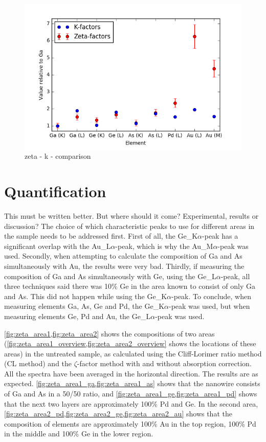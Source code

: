 \begin{figure}[h]
	\centering
	\includegraphics[width=0.7\linewidth]{fig/other/zeta-k-plot-new}
	\caption{zeta - k - comparison}
	\label{fig:zeta-k-comparison}
\end{figure}

\section{Quantification}

This must be written better. But where should it come? Experimental, results or discussion?
The choice of which characteristic peaks to use for different areas in the sample needs to be addressed first. First of all, the Ge\_{K$\alpha$}-peak has a significant overlap with the Au\_{L$\alpha$}-peak, which is why the Au\_{M$\alpha$}-peak was used. Secondly, when attempting to calculate the composition of Ga and As simultaneously with Au, the results were very bad. Thirdly, if measuring the composition of Ga and As simultaneously with Ge, using the Ge\_{L$\alpha$}-peak, all three techniques said there was 10\% Ge in the area known to consist of only Ga and As. This did not happen while using the Ge\_{K$\alpha$}-peak. To conclude, when measuring elements Ga, As, Ge and Pd, the Ge\_{K$\alpha$}-peak was used, but when measuring elements Ge, Pd and Au, the Ge\_{L$\alpha$}-peak was used.

\cref{fig:zeta_area1,fig:zeta_area2} shows the compositions of two areas (\cref{fig:zeta_area1_overview,fig:zeta_area2_overview} shows the locations of these areas) in the untreated sample, as calculated using the Cliff-Lorimer ratio method (CL method) and the $\zeta$-factor method with and without absorption correction. All the spectra have been averaged in the horizontal direction. The results are as expected. \cref{fig:zeta_area1_ga,fig:zeta_area1_as} shows that the nanowire consists of Ga and As in a 50/50 ratio, and \cref{fig:zeta_area1_ge,fig:zeta_area1_pd} shows that the next two layers are approximately 100\% Pd and Ge. In the second area, \cref{fig:zeta_area2_pd,fig:zeta_area2_ge,fig:zeta_area2_au} shows that the composition of elements are approximately 100\% Au in the top region, 100\% Pd in the middle and 100\% Ge in the lower region.

